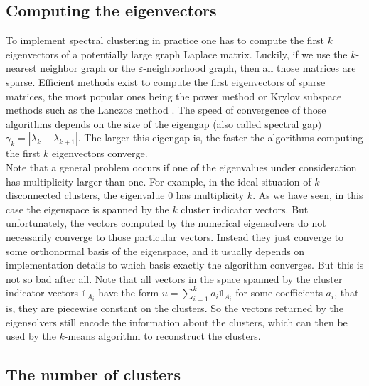 \documentclass{article}
\newcommand{\eps}{\ensuremath{\varepsilon}}
\newcommand{\charfct}{\mathbb{1}}
\begin{document}
%
\subsection{Computing the eigenvectors} \label{ssec-computation}
%
To implement spectral clustering in practice one has to compute the
first $k$ eigenvectors of a potentially large graph Laplace matrix.
Luckily, if we use the $k$-nearest neighbor graph or the
$\eps$-neighborhood graph, then all those matrices are sparse.
Efficient methods exist to compute the first eigenvectors of sparse
matrices, the most popular ones being the power method or Krylov
subspace methods such as the Lanczos method \cite{GolVan96}. The
speed of convergence of those algorithms depends on the size of the
eigengap (also called spectral gap) $\gamma_k
= |\lambda_k - \lambda_{k+1}|$. The larger this eigengap is, the
faster the algorithms computing the first $k$ eigenvectors converge. \\

Note that a general problem occurs if one of the eigenvalues under
consideration has multiplicity larger than one. For example, in the
ideal situation of $k$ disconnected clusters, the eigenvalue $0$ has
multiplicity $k$. As we have seen, in this case the eigenspace is
spanned by the $k$ cluster indicator vectors. But unfortunately, the
vectors computed by the numerical eigensolvers do not necessarily
converge to those particular vectors.  Instead they just converge to
some orthonormal basis of the eigenspace, and it usually depends on
implementation details to which basis exactly the algorithm converges.
But this is not so bad after all. Note that all vectors in the space
spanned by the cluster indicator vectors $\charfct_{A_i}$ have the
form $u = \sum_{i=1}^k a_i \charfct_{A_i}$ for some coefficients
$a_i$, that is, they are piecewise constant on the clusters. So the
vectors returned by the eigensolvers still encode the information
about the clusters, which can then be used by the $k$-means
algorithm to reconstruct the clusters. \\



%
\subsection{The number of clusters} 
%
\end{document}
